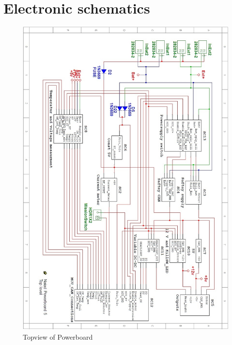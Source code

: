 \section{Electronic schematics}
\label{Schematics_Power}
\begin{figure}[!ht]
	\begin{center}
		\includegraphics[width=13.2cm]{./Images/Powerboard_Scematics/Toplevel.jpg}
		\caption{Topview of Powerboard}
	\end{center}
\end{figure}

